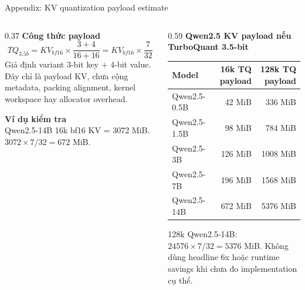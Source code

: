\documentclass[aspectratio=169,10pt]{beamer}
\newcommand{\minihead}[1]{{\bfseries\color{AccentDark}#1}}
\begin{document}
\begin{frame}{Appendix: KV quantization payload estimate}
  \scriptsize
  \begin{columns}[T,onlytextwidth]
    \begin{column}{0.37\textwidth}
      \minihead{Công thức payload}\\
      \[
        TQ_{3.5b}=KV_{bf16}\times\frac{3+4}{16+16}
        =KV_{bf16}\times\frac{7}{32}
      \]
      \vspace{0.12cm}
      \footnotesize\color{Muted}
      Giả định variant 3-bit key + 4-bit value. Đây chỉ là payload KV, chưa cộng metadata, packing alignment, kernel workspace hay allocator overhead.
      \vspace{0.28cm}

      \minihead{Ví dụ kiểm tra}\\
      \footnotesize\color{Muted}
      Qwen2.5-14B 16k bf16 KV = 3072 MiB.\\
      \(3072\times7/32=672\) MiB.
    \end{column}
    \begin{column}{0.59\textwidth}
      \minihead{Qwen2.5 KV payload nếu TurboQuant 3.5-bit}
      \vspace{0.12cm}
      \renewcommand{\arraystretch}{1.14}
      \setlength{\tabcolsep}{4pt}
      \begin{tabular}{l r r}
        \toprule
        Model & 16k TQ payload & 128k TQ payload \\
        \midrule
        Qwen2.5-0.5B & 42 MiB & 336 MiB \\
        Qwen2.5-1.5B & 98 MiB & 784 MiB \\
        Qwen2.5-3B & 126 MiB & 1008 MiB \\
        Qwen2.5-7B & 196 MiB & 1568 MiB \\
        Qwen2.5-14B & 672 MiB & 5376 MiB \\
        \bottomrule
      \end{tabular}\par
      \vspace{0.22cm}
      \footnotesize\color{Muted}
      128k Qwen2.5-14B: \(24576\times7/32=5376\) MiB. Không dùng headline 6x hoặc runtime savings khi chưa đo implementation cụ thể.
    \end{column}
  \end{columns}
\end{frame}
\end{document}
